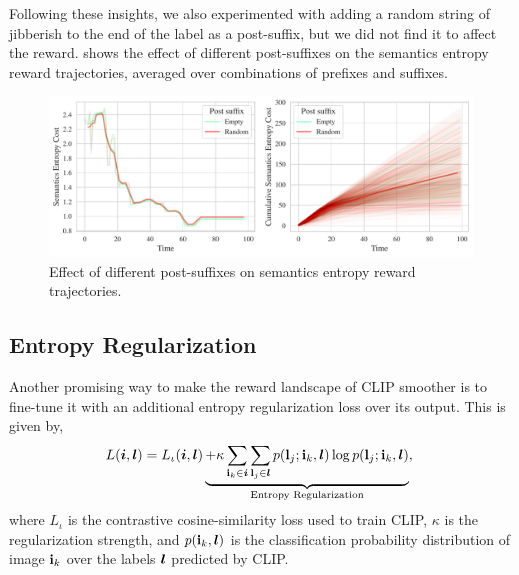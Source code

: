 Following these insights, we also experimented with adding a random string of jibberish to the end of the label as a post-suffix, but we did not find it to affect the reward.
 shows the effect of different post-suffixes on the semantics entropy reward trajectories, averaged over combinations of prefixes and suffixes.

\begin{figure}[h]
    \centering
    \includegraphics[width=\textwidth]{images/post_suffix_comparison.pdf}
    \caption{Effect of different post-suffixes on semantics entropy reward trajectories.}
    \label{fig:post-suffix}
\end{figure}


\newpage
\subsection{Entropy Regularization}
\label{sec:entropy-regularization}
Another promising way to make the reward landscape of CLIP smoother is to fine-tune it with an additional entropy regularization loss over its output.
This is given by,
\begin{equation}
    \label{eq:entropy-regularization}
    L(\bm{i}, \bm{l}) = L_{\iota}(\bm{i}, \bm{l}) \underbrace{+ \kappa \sum_{\mathbf{i}_k \in \bm{i}}\sum_{\mathbf{l}_j \in \bm{l}} p(\mathbf{l}_j; \mathbf{i}_k, \bm{l}) \log p(\mathbf{l}_j; \mathbf{i}_k, \bm{l})}_{\text{Entropy Regularization}},\\
\end{equation}
where \(L_{\iota}\) is the contrastive cosine-similarity loss used to train CLIP, $\kappa$ is the regularization strength, and \(p(\mathbf{i}_k, \bm{l})\) is the classification probability distribution of image \(\mathbf{i}_k\) over the labels \(\bm{l}\) predicted by CLIP.

